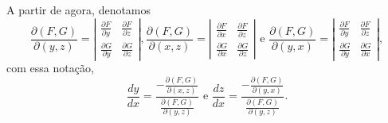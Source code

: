     A partir de agora, denotamos \[ \frac{\partial(F,G)}{\partial(y,z)} = \left|\begin{matrix}
            \frac{\partial F}{\partial y} & \frac{\partial F}{\partial z} \\ \frac{\partial G}{\partial y} & \frac{\partial G}{\partial z}
        \end{matrix}\right|, \frac{\partial(F,G)}{\partial(x,z)} = \left|\begin{matrix}
            \frac{\partial F}{\partial x} & \frac{\partial F}{\partial z} \\ \frac{\partial G}{\partial x} & \frac{\partial G}{\partial z}
        \end{matrix}\right| \text{ e } \frac{\partial(F,G)}{\partial(y,x)} = \left|\begin{matrix}
            \frac{\partial F}{\partial y} & \frac{\partial F}{\partial z} \\ \frac{\partial G}{\partial y} & \frac{\partial G}{\partial x}
        \end{matrix}\right|,\] com essa notação,
            \begin{equation}\label{eqn.DerivadaImplicita}
                \frac{dy}{dx} = \frac{-\frac{\partial(F,G)}{\partial(x,z)}}{\frac{\partial(F,G)}{\partial(y,z)}} \text{ e } \frac{dz}{dx} = \frac{-\frac{\partial(F,G)}{\partial(y,x)}}{\frac{\partial(F,G)}{\partial(y,z)}}.
            \end{equation}
        
